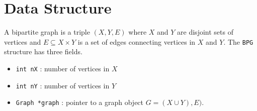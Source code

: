 \par
\section{Data Structure}
\label{section:BPG:dataStructure}
\par
A bipartite graph is a triple $(X,Y,E)$
where $X$ and $Y$ are disjoint sets of vertices
and $E \subseteq X \times Y$ is a set of edges connecting vertices
in $X$ and $Y$.
The {\tt BPG} structure has three fields.
\begin{itemize}
\item {\tt int nX} : number of vertices in $X$
\item {\tt int nY} : number of vertices in $Y$
\item {\tt Graph *graph} 
: pointer to a graph object $G = (X \cup Y), E)$.
\end{itemize}

